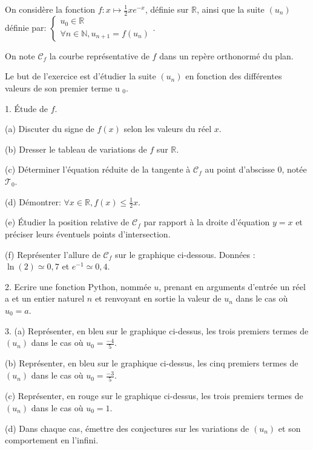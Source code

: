 \documentclass[a4paper, 11pt,reqno]{article}
\begin{document}
\begin{exercice}

On considère la fonction $f: x \longmapsto \frac{1}{2} x e^{-x}$, définie sur $\mathbb{R}$, ainsi que la suite $\left(u_{n}\right)$ définie par: $\left\{\begin{array}{l}u_{0} \in \mathbb{R} \\ \forall n \in \mathbb{N}, u_{n+1}=f\left(u_{n}\right)\end{array}\right.$.

On note $\mathcal{C}_{f}$ la courbe représentative de $f$ dans un repère orthonormé du plan.

Le but de l'exercice est d'étudier la suite $\left(u_{n}\right)$ en fonction des différentes valeurs de son premier terme u $_{0}$.

1. Étude de $f$.

(a) Discuter du signe de $f(x)$ selon les valeurs du réel $x$.

(b) Dresser le tableau de variations de $f$ sur $\mathbb{R}$.

(c) Déterminer l'équation réduite de la tangente à $\mathcal{C}_{f}$ au point d'abscisse 0, notée $\mathcal{T}_{0}$.

(d) Démontrer: $\forall x \in \mathbb{R}, f(x) \leq \frac{1}{2} x$.

(e) Étudier la position relative de $\mathcal{C}_{f}$ par rapport à la droite d'équation $y=x$ et préciser leurs éventuels points d'intersection.

(f) Représenter l'allure de $\mathcal{C}_{f}$ sur le graphique ci-dessous. Données : $\ln (2) \simeq 0,7$ et $e^{-1} \simeq 0,4$.



2. Ecrire une fonction Python, nommée $u$, prenant en arguments d'entrée un réel a et un entier naturel $n$ et renvoyant en sortie la valeur de $u_{n}$ dans le cas où $u_{0}=a$.

3. (a) Représenter, en bleu sur le graphique ci-dessus, les trois premiers termes de $\left(u_{n}\right)$ dans le cas où $u_{0}=\frac{-4}{5}$.

(b) Représenter, en bleu sur le graphique ci-dessus, les cinq premiers termes de $\left(u_{n}\right)$ dans le cas où $u_{0}=\frac{-3}{5}$.

(c) Représenter, en rouge sur le graphique ci-dessus, les trois premiers termes de $\left(u_{n}\right)$ dans le cas où $u_{0}=1$.

(d) Dans chaque cas, émettre des conjectures sur les variations de $\left(u_{n}\right)$ et son comportement en l'infini.


\end{exercice}
\end{document}
